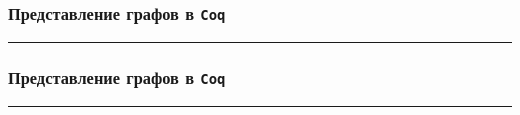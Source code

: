 \documentclass[14pt]{beamer}
\begin{document}
\begin{frame}[fragile]
\frametitle{Представление графов в {\tt Coq}}
\begin{figure}[h]
  \begin{minipage}[h]{1\linewidth}
  \end{minipage}
\end{figure}
\hrule
\begin{figure}[h]
  \begin{minipage}[h]{1\linewidth}
  \end{minipage}
\end{figure}
\end{frame}

\begin{frame}[fragile]
\frametitle{Представление графов в {\tt Coq}}
\begin{figure}[h]
  \begin{minipage}[h]{1\linewidth}
  \end{minipage}
\end{figure}
\hrule
\begin{figure}[h]
  \begin{minipage}[h]{1\linewidth}
  \end{minipage}
\end{figure}
\end{frame}
\end{document}
